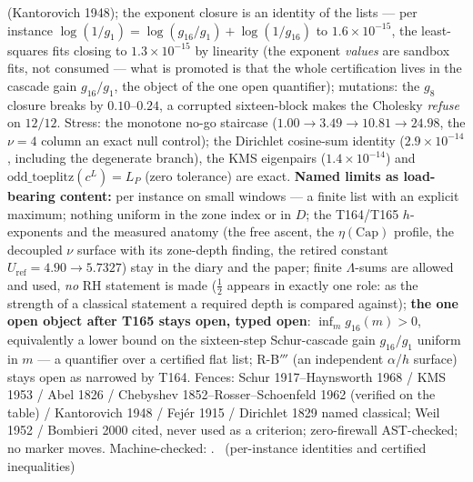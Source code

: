 (Kantorovich 1948); the exponent closure is an identity of the lists
--- per instance $\log(1/g_1)=\log(g_{16}/g_1)+\log(1/g_{16})$ to
$1.6\times10^{-15}$, the least-squares fits closing to
$1.3\times10^{-15}$ by linearity (the exponent \emph{values} are
sandbox fits, not consumed --- what is promoted is that the whole
certification lives in the cascade gain $g_{16}/g_1$, the object of
the one open quantifier); mutations: the $g_8$ closure breaks by
$0.10$--$0.24$, a corrupted sixteen-block makes the Cholesky
\emph{refuse} on $12/12$. Stress: the monotone no-go staircase
($1.00\to3.49\to10.81\to24.98$, the $\nu=4$ column an exact null
control); the Dirichlet cosine-sum identity ($2.9\times10^{-14}$,
including the degenerate branch), the KMS eigenpairs
($1.4\times10^{-14}$) and $\mathrm{odd\_toeplitz}(c^L)=L_P$ (zero
tolerance) are exact.
\textbf{Named limits as load-bearing content:} per instance on small
windows --- a finite list with an explicit maximum; nothing uniform in
the zone index or in $D$; the T164/T165 $h$-exponents and the measured
anatomy (the free ascent, the $\eta(\mathrm{Cap})$ profile, the
decoupled $\nu$ surface with its zone-depth finding, the retired
constant $U_{\mathrm{ref}}=4.90\to5.7327$) stay in the diary and the
paper; finite $\Lambda$-sums are allowed and used, \emph{no} RH
statement is made ($\tfrac12$ appears in exactly one role: as the
strength of a classical statement a required depth is compared
against); \textbf{the one open object after T165 stays open, typed
open}: $\inf_m g_{16}(m)>0$, equivalently a lower bound on the
sixteen-step Schur-cascade gain $g_{16}/g_1$ uniform in $m$ --- a
quantifier over a certified flat list; R-B$'''$ (an independent
$\alpha$/$h$ surface) stays open as narrowed by T164. Fences: Schur
1917--Haynsworth 1968 / KMS 1953 / Abel 1826 / Chebyshev
1852--Rosser--Schoenfeld 1962 (verified on the table) / Kantorovich
1948 / Fej\'er 1915 / Dirichlet 1829 named classical; Weil 1952 /
Bombieri 2000 cited, never used as a criterion; zero-firewall
AST-checked; no marker moves.
Machine-checked: .
\mE\ (per-instance identities and certified inequalities)



